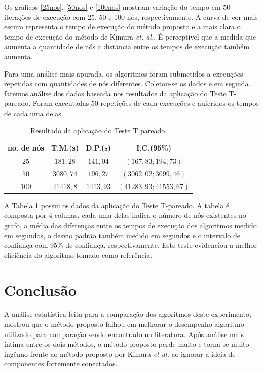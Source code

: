 \documentclass{acm_proc_article-sp}
\begin{document}
Os gráficos \ref{25nos}, \ref{50nos} e \ref{100nos} mostram variação do tempo em 50 iterações de execução
com 25, 50 e 100 nós, respectivamente. A curva de cor mais escura representa o tempo de execução do método
proposto e a mais clara o tempo de execução do método de Kimura \textit{et. al.}. É perceptível que a medida que
aumenta a quantidade de nós a distância entre os tempos de execução também aumenta.

Para uma análise mais apurada, os algoritmos foram submetidos a execuções repetidas com quantidades de nós
diferentes. Coletou-se os dados e em seguida faremos análise dos dados baseada nos resultados da aplicação do Teste
T-pareado. Foram executadas 50 repetições de cada execuções e auferidos os tempos de cada uma delas.

\begin{table}[!h] \label{tabpareado}
\centering
\begin{tabular}{|c|c|c|c|}
\hline 
\hline\textbf{no. de nós}  & \textbf{T.M.(s)} & \textbf{D.P.(s)} &\textbf{I.C.(95\%) }\\
\hline 
\hline \textbf{$25$}   & $181,28$  & $141,04$ & $(167,83; 194,73)$\\
\hline \textbf{$50$}   & $3080,74$  & $196,27$ & $(3062,02; 3099,46)$\\
\hline \textbf{$100$}  & $41418,8$ & $1413,93$ & $(41283,93; 41553,67)$\\
\hline \hline
\end{tabular}
\caption{Resultado da aplicação do Teste T pareado.}
\end{table}

A Tabela \ref{tabpareado} possui os dados da aplicação do Teste T-pareado. A tabela é composta por 4 colunas, cada
uma delas indica o número de nós existentes no grafo, a média das diferenças entre os tempos de execução dos
algoritmos medido em segundos, o desvio padrão também medido em segundos e o intervalo de confiança com 95\% de
confiança, respectivamente. Este teste evidenciou a melhor eficiência do algoritmo tomado como referência.

\section{Conclusão}
A análise estatística feita para a comparação dos algoritmos deste experimento, mostrou que o método proposto
falhou em melhorar o desempenho algoritmo utilizado para comparação sendo encontrado na literatura. Após análise
mais íntima entre os dois métodos, o método proposto perde muito e torna-se muito ingênuo frente ao método proposto
por Kimura \textit{et al.} ao ignorar a ideia de componentes fortemente conectados.
\end{document}
